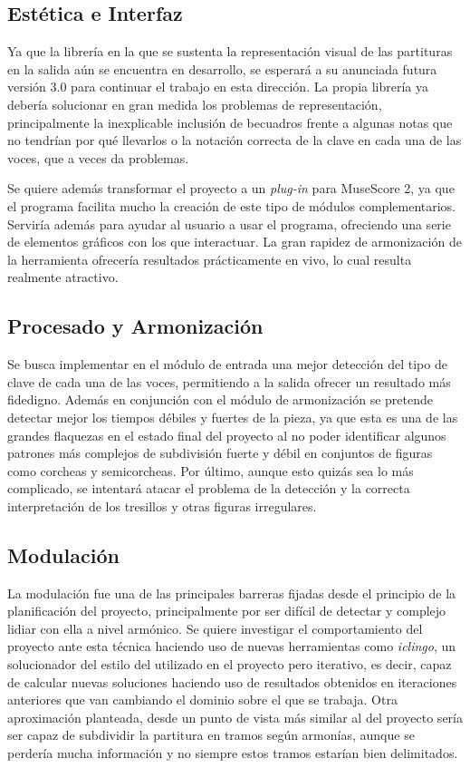 \subsection{Estética e Interfaz}
\label{subsec:look_interface}
Ya que la librería en la que se sustenta la representación visual de las partituras en la salida aún se encuentra en desarrollo, se esperará a su anunciada futura versión 3.0 para continuar el trabajo en esta dirección. La propia librería ya debería solucionar en gran medida los problemas de representación, principalmente la inexplicable inclusión de becuadros frente a algunas notas que no tendrían por qué llevarlos o la notación correcta de la clave en cada una de las voces, que a veces da problemas. 

Se quiere además transformar el proyecto a un \textit{plug-in} para MuseScore 2, ya que el programa facilita mucho la creación de este tipo de módulos complementarios. Serviría además para ayudar al usuario a usar el programa, ofreciendo una serie de elementos gráficos con los que interactuar. La gran rapidez de armonización de la herramienta ofrecería resultados prácticamente en vivo, lo cual resulta realmente atractivo. 

\subsection{Procesado y Armonización}
\label{subsec:parsing_harm}
Se busca implementar en el módulo de entrada una mejor detección del tipo de clave de cada una de las voces, permitiendo a la salida ofrecer un resultado más fidedigno. Además en conjunción con el módulo de armonización se pretende detectar mejor los tiempos débiles y fuertes de la pieza, ya que esta es una de las grandes flaquezas en el estado final del proyecto al no poder identificar algunos patrones más complejos de subdivisión fuerte y débil en conjuntos de figuras como corcheas y semicorcheas. Por último, aunque esto quizás sea lo más complicado, se intentará atacar el problema de la detección y la correcta interpretación de los tresillos y otras figuras irregulares.

\subsection{Modulación}
\label{subsec:future_modulation}
La modulación fue una de las principales barreras fijadas desde el principio de la planificación del proyecto, principalmente por ser difícil de detectar y complejo lidiar con ella a nivel armónico. Se quiere investigar el comportamiento del proyecto ante esta técnica haciendo uso de nuevas herramientas como \textit{iclingo}, un solucionador del estilo del utilizado en el proyecto pero iterativo, es decir, capaz de calcular nuevas soluciones haciendo uso de resultados obtenidos en iteraciones anteriores que van cambiando el dominio sobre el que se trabaja.
Otra aproximación planteada, desde un punto de vista más similar al del proyecto sería ser capaz de subdividir la partitura en tramos según armonías, aunque se perdería mucha información y no siempre estos tramos estarían bien delimitados.

